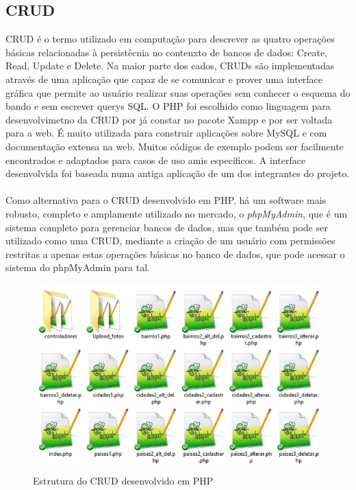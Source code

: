 \documentclass[10pt]{article}
\begin{document}
\begin{multicols}{2}
\subsection{CRUD}
 CRUD é o termo utilizado em computação para descrever as quatro operações básicas relacionadas à persistêcnia no contenxto de bancos de dados: Create, Read, Update e Delete. Na maior parte dos cados, CRUDs são implementadas  através de uma aplicação que capaz de se comunicar e prover uma interface gráfica que permite ao usuário realizar suas operações sem conhecer o esquema do bando e sem escrever querys SQL. O PHP foi escolhido como linguagem para desenvolvimetno da CRUD por já constar no pacote Xampp e por ser voltada para a web. É muito utilizada para construir aplicações sobre MySQL e com documentação extensa na web. Muitos códigos de exemplo podem ser facilmente encontrados e adaptados para casos de uso amis específicos. A interface desenvolvida foi baseada numa antiga aplicação de um dos integrantes do projeto. \\
\\Como alternativa para o CRUD desenvolvido em PHP, há um software mais robusto, completo e amplamente utilizado no mercado, o \emph{phpMyAdmin}, que é um sistema completo para gerenciar bancos de dados, mas que também  pode ser utilizado como uma CRUD, mediante a criação de um usuário com permissões restritas a apenas estas operações básicas no banco de dados, que pode acessar o sistema do phpMyAdmin para tal.

\end{multicols}

\begin{center}
\begin{figure}[h!]
\includegraphics[scale=0.45]{crud.jpg}
\caption{Estrutura do CRUD desenvolvido em PHP}
\end{figure}
\end{center}
\end{document}
